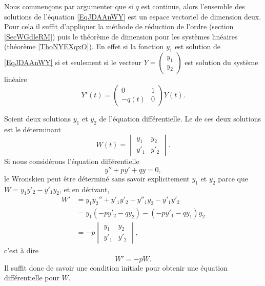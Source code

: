 Nous commençons par argumenter que si \( q\) est continue, alors l'ensemble des solutions de l'équation \eqref{EqJDAAnWY} est un espace vectoriel de dimension deux. Pour cela il suffit d'appliquer la méthode de réduction de l'ordre (section \ref{SecWGdleRM}) puis le théorème de dimension pour les systèmes linéaires (théorème \ref{ThoNYEXqxO}). En effet si la fonction \( y_1\) est solution de \eqref{EqJDAAnWY} si et seulement si le vecteur \(Y= \begin{pmatrix}
    y_1    \\ 
    y_2    
\end{pmatrix}\) est solution du système linéaire
\begin{equation}
    Y'(t)=\begin{pmatrix}
        0    &   1    \\ 
        -q(t)    &   0    
    \end{pmatrix}Y(t).
\end{equation}

Soient deux solutions \( y_1\) et \( y_2\) de l'équation différentielle. Le  de ces deux solutions est le déterminant
\begin{equation}
    W(t)=\begin{vmatrix}
        y_1    &   y_2    \\ 
        y'_1    &   y'_2    
    \end{vmatrix}.
\end{equation}
Si nous considérons l'équation différentielle
\begin{equation}
    y''+py'+qy=0,
\end{equation}
le Wronskien peut être déterminé sans savoir explicitement \( y_1\) et \( y_2\) parce que \( W=y_1y'_2-y'_1y_2\), et en dérivant,
\begin{subequations}
    \begin{align}
        W'&=y_1y_2''+y'_1y'_2-y''_1y_2-y'_1y'_2\\
        &=y_1(-py'_2-qy_2)-(-py'_1-qy_1)y_2\\
        &=-p\begin{vmatrix}
            y_1    &   y_2    \\ 
            y'_1    &   y'_2    
        \end{vmatrix},
    \end{align}
\end{subequations}
c'est à dire
\begin{equation}    \label{EqHEMRgM}
    W'=-pW.
\end{equation}
Il suffit donc de savoir une condition initiale pour obtenir une équation différentielle pour \( W\).

